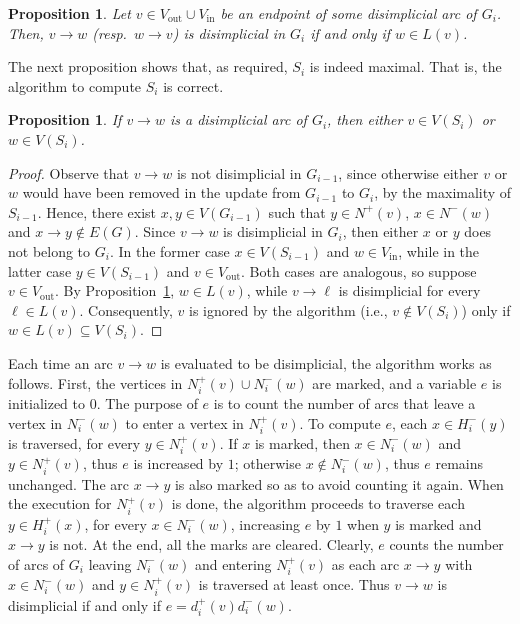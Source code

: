 \documentclass[a4paper,11pt]{article}
\newtheorem{proposition}[theorem]{Proposition}
\newcommand{\IN}{\ensuremath{\mathrm{in}}}
\newcommand{\OUT}{\ensuremath{\mathrm{out}}}
\begin{document}
\begin{proposition}\label{prop:disimplicial in L}
  Let $v \in V_{\OUT} \cup V_{\IN}$ be an endpoint of some disimplicial arc of $G_i$.  Then, $v \to w$ (resp.\ $w \to v$) is disimplicial in $G_i$ if and only if $w \in L(v)$.
\end{proposition}

The next proposition shows that, as required, $S_i$ is indeed maximal.  That is, the algorithm to compute $S_i$ is correct. 

\begin{proposition}
 If $v \to w$ is a disimplicial arc of $G_i$, then either $v \in V(S_i)$ or $w \in V(S_i)$.
\end{proposition}

\begin{proof}
  Observe that $v \to w$ is not disimplicial in $G_{i-1}$, since otherwise either $v$ or $w$ would have been removed in the update from $G_{i-1}$ to $G_i$, by the maximality of $S_{i-1}$.  Hence, there exist $x,y \in V(G_{i-1})$ such that $y \in N^+(v)$, $x \in N^-(w)$ and $x \to y \not\in E(G)$.  Since $v\to w$ is disimplicial in $G_{i}$, then either $x$ or $y$ does not belong to $G_i$.  In the former case $x \in V(S_{i-1})$ and $w \in V_{\IN}$, while in the latter case $y \in V(S_{i-1})$ and $v \in V_{\OUT}$.  Both cases are analogous, so suppose $v \in V_{\OUT}$.  By Proposition~\ref{prop:disimplicial in L}, $w \in L(v)$, while $v \to \ell$ is disimplicial for every $\ell \in L(v)$.  Consequently, $v$ is ignored by the algorithm (i.e., $v \not\in V(S_i)$) only if $w \in L(v) \subseteq V(S_i)$.
\end{proof}

Each time an arc $v \to w$ is evaluated to be disimplicial, the algorithm works as follows.  First, the vertices in $N_i^+(v) \cup N_i^-(w)$ are marked, and a variable $e$ is initialized to $0$.  The purpose of $e$ is to count the number of arcs that leave a vertex in $N_i^-(w)$ to enter a vertex in $N_i^+(v)$.  To compute $e$, each $x \in H_i^-(y)$ is traversed, for every $y \in N_i^+(v)$. If $x$ is marked, then $x \in N_i^-(w)$ and $y \in N_i^+(v)$, thus $e$ is increased by $1$; otherwise $x \not\in N_i^-(w)$, thus $e$ remains unchanged.  The arc $x \to y$ is also marked so as to avoid counting it again.  When the execution for $N_i^+(v)$ is done, the algorithm proceeds to traverse each $y \in H_i^+(x)$, for every $x \in N_i^-(w)$, increasing $e$ by $1$ when $y$ is marked and $x \to y$ is not.  At the end, all the marks are cleared.  Clearly, $e$ counts the number of arcs of $G_i$ leaving $N_i^-(w)$ and entering $N_i^+(v)$ as each arc $x \to y$ with $x \in N_i^-(w)$ and $y \in N_i^+(v)$ is traversed at least once.  Thus $v \to w$ is disimplicial if and only if $e = d_i^+(v)d_i^-(w)$.
\end{document}

